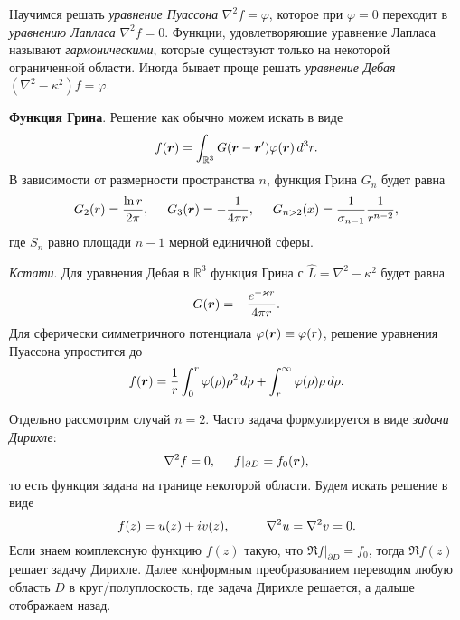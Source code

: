 

Научимся решать \textit{уравнение Пуассона} $\nabla^2 f  = \varphi$, которое при $\varphi = 0$ переходит в \textit{уравнению Лапласа} $\nabla^2 f = 0$. 
Функции, удовлетворяющие уравнение Лапласа называют \textit{гармоническими}, которые существуют только на некоторой ограниченной области. 
Иногда бывает проще решать \textit{уравнение Дебая} $(\nabla^2 - \kappa^2) f = \varphi$.


\textbf{Функция Грина}. Решение как обычно можем искать в виде
\begin{equation*}
    f(\mbox{\boldmath $r$}) = \int_{\mathbb{R}^3} G(\mbox{\boldmath $r$}  - \mbox{\boldmath $r$}') \varphi(\mbox{\boldmath $r$}) \, d^3 r.
\end{equation*}
В зависимости от размерности пространства $n$, функция Грина $G_n$ будет равна
\begin{equation}
    G_2(r) = \frac{\ln r}{2 \pi},
    \hspace{5 mm} 
    G_3(\mbox{\boldmath $r$}) = - \frac{1}{4 \pi r},
    \hspace{5 mm} 
    G_{n > 2}(x) = \frac{1}{\sigma_{n-1}} \frac{1}{r^{n-2}},
\end{equation}
где $S_n$ равно площади $n-1$ мерной единичной сферы.

\textit{Кстати}. 
Для уравнения Дебая в $\mathbb{R}^3$ функция Грина с $\hat{L} = \nabla^2 - \kappa^2$ будет равна
\begin{equation*}
    G(\mbox{\boldmath $r$}) = - \frac{e^{- \varkappa r}}{4 \pi r}.
\end{equation*}
Для сферически симметричного потенциала $\varphi(\mbox{\boldmath $r$}) \equiv \varphi(r)$, решение уравнения Пуассона упростится до 
\begin{equation*}
    f(\mbox{\boldmath $r$}) = \frac{1}{r} \int_{0}^{r} \varphi(\rho) \rho^2 \, d \rho + \int_{r}^{\infty} \varphi(\rho) \rho \, d \rho.
\end{equation*}



Отдельно рассмотрим случай $n=2$. Часто задача формулируется в виде \textit{задачи Дирихле}:
\begin{equation*}
    \nabla^2 f = 0, 
    \hspace{5 mm} 
    f|_{\partial D} = f_0 (\mbox{\boldmath $r$}),
\end{equation*}
то есть функция задана на границе некоторой области. Будем искать решение в виде
\begin{equation*}
    f(z) = u(z) + i v(z),
    \hspace{10 mm} 
    \nabla^2 u = \nabla^2 v = 0.
\end{equation*}
Если знаем комплексную функцию $f(z)$ такую, что $\Re f |_{\partial D} = f_0$, тогда $\Re f(z)$ решает задачу Дирихле.
Далее конформным преобразованием переводим любую область $D$ в круг/полуплоскость, где задача Дирихле решается, а дальше отображаем назад. 

